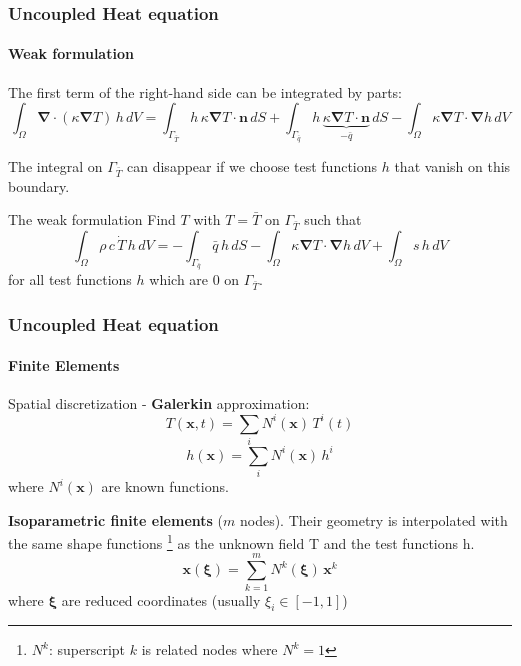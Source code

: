 \documentclass[10pt,xcolor=pdftex,dvipsnames,table]{beamer}
\begin{document}
\begin{frame}
	\frametitle{ Uncoupled Heat equation }
	\framesubtitle{ Weak formulation }
	
	The first term of the right-hand side can be integrated by parts:
	\begin{equation*}
	\int_{\Omega} \boldsymbol{\nabla}\cdot \left(  \kappa \boldsymbol{\nabla} T \right) \, h \, dV
	= \int_{\Gamma_{\bar{T}}} h\,  \kappa \boldsymbol{\nabla} T \cdot \boldsymbol{n}\, dS
	+ \int_{\Gamma_{\bar{q}}} h\,  \underbrace{\kappa \boldsymbol{\nabla} T \cdot \boldsymbol{n}}_{-\bar{q}}\, dS
	- \int_{\Omega} \kappa \boldsymbol{\nabla} T \cdot \boldsymbol{\nabla}h \, dV
	\end{equation*}	
	
	The integral on $\Gamma_{\bar{T}}$ can disappear if we choose test functions $h$ that vanish on this boundary.
		

	
	\begin{block}{The weak formulation}
		Find $T$ with $T=\bar{T}$ on $\Gamma_{\bar{T}}$ such that
		\begin{equation*}
			\int_{\Omega}\rho\,c\,\dot{T}\,h\,dV 
			= - \int_{\Gamma_{\bar{q}}} \bar{q}\, h\, dS
			- \int_{\Omega} \kappa \boldsymbol{\nabla} T \cdot \boldsymbol{\nabla}h \, dV
			+ \int_{\Omega} s\, h\, dV
		\end{equation*}	
		for all test functions $h$ which are 0 on $\Gamma_{\bar{T}}$.
	\end{block}
		
	
\end{frame}



\begin{frame}
	\frametitle{ Uncoupled Heat equation }
	\framesubtitle{ Finite Elements }
	
	Spatial discretization - \textbf{Galerkin} approximation:
	\begin{equation*}
		T(\boldsymbol{x}, t) = \sum_i N^i(\boldsymbol{x})\,T^i(t)
	\end{equation*}	
	\begin{equation*}
		h(\boldsymbol{x}) = \sum_i N^i(\boldsymbol{x})\,h^i
	\end{equation*}		
	where $N^i(\boldsymbol{x})$ are known functions.
	
	\bigskip
	
	\textbf{Isoparametric finite elements} ($m$ nodes). Their geometry is interpolated with the same shape functions
	\footnote{$N^k$: superscript $k$ is related nodes where $N^k=1$}
	 as the unknown field T and the test functions h.
	\begin{equation*}
		\boldsymbol{x}(\boldsymbol{\xi}) = \sum_{k=1}^m N^k(\boldsymbol{\xi})\,\boldsymbol{x}^k
	\end{equation*}	
	where $\boldsymbol{\xi}$ are reduced coordinates (usually $\xi_i\in[-1,1]$)
\end{frame}
\end{document}
